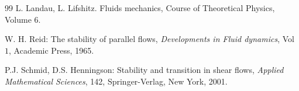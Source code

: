 \documentclass[11pt]{article}
\begin{document}
\begin{thebibliography}{99}
 L. Landau, L. Lifshitz. Fluids mechanics, Course of Theoretical Physics, Volume $6$.

 W. H. Reid: The stability of parallel flows, {\it Developments in Fluid dynamics}, Vol $1$, Academic Press, 1965.

 P.J. Schmid, D.S. Henningson: Stability and transition in shear flows,  {\it Applied Mathematical Sciences}, 142,  Springer-Verlag, New York,  2001.




\end{thebibliography}

\end{document}
